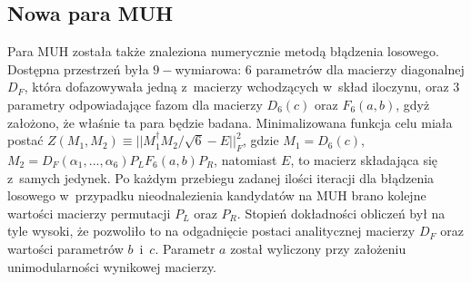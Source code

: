 \documentclass[a4paper,12pt,twoside]{article}
\begin{document}
\subsection*{Nowa para MUH}

Para MUH zosta{\l}a tak\.{z}e znaleziona numerycznie metod\k{a} b{\l}\k{a}dzenia losowego. Dos\-t\k{e}p\-na przestrze\'{n} by{\l}a $9-$wymiarowa: $6$ parametr\'{o}w dla macierzy diagonalnej $D_F$, kt\'{o}ra dofazowywa{\l}a jedn\k{a} z~macierzy wchodz\k{a}cych w~sk{\l}ad iloczynu, oraz $3$ parametry od\-po\-wia\-da\-j\k{a}\-ce fazom dla macierzy $D_6(c)$ oraz $F_6(a,b)$, gdy\.{z} za{\l}o\.{z}ono, \.{z}e w{\l}a\'{s}nie ta para b\k{e}dzie badana. Minimalizowana funkcja celu mia{\l}a posta\'{c} $Z(M_1, M_2)\equiv ||M_1^{\dagger}M_2/\sqrt{6} - E||^2_F$, gdzie $M_1 = D_6(c)$, $M_2 = D_F(\alpha_1,...,\alpha_6) P_L F_6(a,b) P_R$, natomiast $E$, to macierz sk{\l}adaj\k{a}ca si\k{e} z~samych jedynek. Po ka\.{z}dym przebiegu zadanej ilo\'{s}ci iteracji dla b{\l}\k{a}dzenia losowego w~przypadku nieodnalezienia kandydat\'{o}w na MUH brano ko\-lej\-ne warto\'{s}ci macierzy permutacji $P_L$ oraz $P_R$. Stopie\'{n} dok{\l}adno\'{s}ci oblicze\'{n} by{\l} na tyle wysoki, \.{z}e pozwoli{\l}o to na odgadni\k{e}cie postaci analitycznej macierzy $D_F$ oraz warto\'{s}ci parametr\'{o}w $b$~i~$c$. Parametr $a$ zosta{\l} wyliczony przy za{\l}o\.{z}eniu unimodularno\'{s}ci wynikowej macierzy.
\end{document}

